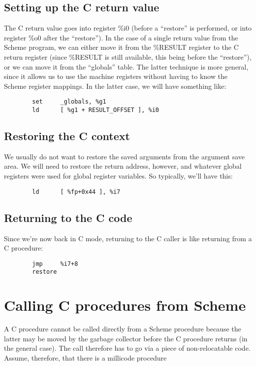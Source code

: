 \subsection{Setting up the C return value}

The C return value goes into register \%i0 (before a ``restore'' is
performed, or into register \%o0 after the ``restore''). In the case of a
single return value from the Scheme program, we can either move it
from the \%RESULT register to the C return register (since \%RESULT is
still available, this being before the ``restore''), or we can move it
from the ``globals'' table. The latter technique is more general, since
it allows us to use the machine registers without having to know the
Scheme register mappings. In the latter case, we will have something
like:

\begin{verbatim}
        set     _globals, %g1
        ld      [ %g1 + RESULT_OFFSET ], %i0
\end{verbatim}

\subsection{Restoring the C context}

We usually do not want to restore the saved arguments from the argument
save area. We will need to restore the return address, however, and whatever
global registers were used for global register variables. So typically,
we'll have this:

\begin{verbatim}
        ld      [ %fp+0x44 ], %i7
\end{verbatim}

\subsection{Returning to the C code}

Since we're now back in C mode, returning to the C caller is like returning
from a C procedure:

\begin{verbatim}
        jmp     %i7+8
        restore
\end{verbatim}

\section{Calling C procedures from Scheme}

A C procedure cannot be called directly from a Scheme procedure because 
the latter may be moved by the garbage collector before the C procedure
returns (in the general case). The call therefore has to go via a
piece of non-relocatable code. Assume, therefore, that there is a 
millicode procedure

